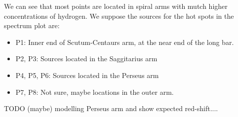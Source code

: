 We can see that most points are located in spiral arms with mutch higher concentrations of hydrogen. We suppose the sources for the hot spots in the spectrum plot are:
\begin{itemize}
	\item P1: Inner end of Scutum-Centaurs arm, at the near end of the long bar.
	\item P2, P3: Sources located in the Saggitarius arm
	\item P4, P5, P6: Sources located in the Perseus arm
	\item P7, P8: Not sure, maybe locations in the outer arm.
\end{itemize}

TODO (maybe) modelling Perseus arm and show expected red-shift.... 